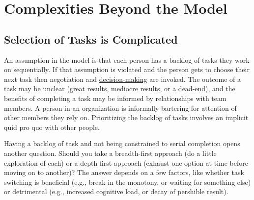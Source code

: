 





\section{Complexities Beyond the Model}

\subsection*{Selection of Tasks is Complicated}

An assumption in the model is that each person has a backlog of tasks they work on sequentially. If that assumption is violated and the person gets to choose their next task then negotiation and 
\href{https://en.wikipedia.org/wiki/Decision-making}{decision-making}
are invoked. The outcome of a task may be unclear (great results, mediocre results, or a dead-end), and the benefits of completing a task may be informed by relationships with team members. A person in an organization is informally bartering for attention of other members they rely on. Prioritizing the backlog of tasks involves an implicit quid pro quo with other people. 

Having a backlog of task and not being constrained to serial completion opens another question. Should you take a breadth-first approach (do a little exploration of each) or a depth-first approach (exhaust one option at time before moving on to another)? The answer depends on a few factors, like whether task switching is beneficial (e.g., break in the monotony, or waiting for something else) or detrimental (e.g., increased cognitive load, or decay of pershible result). 

